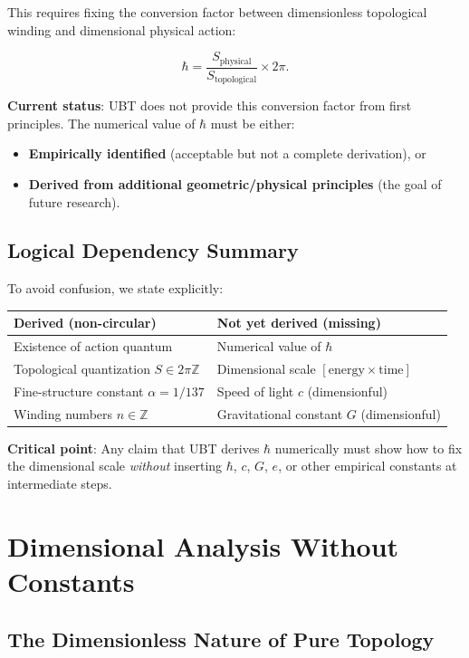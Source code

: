 \documentclass[12pt]{article}
\begin{document}
This requires fixing the conversion factor between dimensionless topological winding and dimensional physical action:

\[
\hbar = \frac{S_{\text{physical}}}{S_{\text{topological}}} \times 2\pi.
\]

\textbf{Current status}: UBT does not provide this conversion factor from first principles. The numerical value of $\hbar$ must be either:
\begin{itemize}
\item \textbf{Empirically identified} (acceptable but not a complete derivation), or
\item \textbf{Derived from additional geometric/physical principles} (the goal of future research).
\end{itemize}

\subsection{Logical Dependency Summary}

To avoid confusion, we state explicitly:

\begin{center}
\begin{tabular}{|l|l|}
\hline
\textbf{Derived (non-circular)} & \textbf{Not yet derived (missing)} \\
\hline
Existence of action quantum & Numerical value of $\hbar$ \\
Topological quantization $S \in 2\pi\mathbb{Z}$ & Dimensional scale $[\text{energy} \times \text{time}]$ \\
Fine-structure constant $\alpha = 1/137$ & Speed of light $c$ (dimensionful) \\
Winding numbers $n \in \mathbb{Z}$ & Gravitational constant $G$ (dimensionful) \\
\hline
\end{tabular}
\end{center}

\textbf{Critical point}: Any claim that UBT derives $\hbar$ numerically must show how to fix the dimensional scale \emph{without} inserting $\hbar$, $c$, $G$, $e$, or other empirical constants at intermediate steps.

\section{Dimensional Analysis Without Constants}

\subsection{The Dimensionless Nature of Pure Topology}
\end{document}

